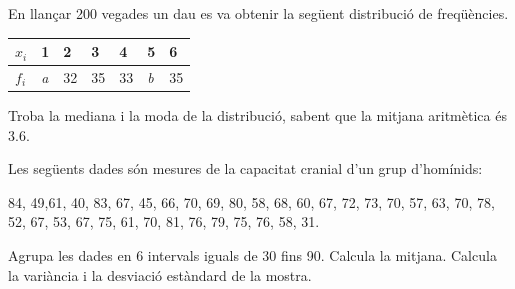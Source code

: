 \begin{activitats}
	\begin{mylist}
		 
\exer  En llançar 200 vegades un dau es va obtenir la següent distribució de freqüències. 
 
\begin{tabular}{|p{0.2in}|p{0.2in}|p{0.2in}|p{0.2in}|p{0.2in}|p{0.2in}|p{0.2in}|} \hline
	
	$x_i$ &  1 & 2 & 3 & 4 & 5  & 6 \\ \hline
    $f_i$ & \textit{a} & 32 & 35  & 33 & \textit{b}  & 35\\ \hline
 
\end{tabular} 

\noindent Troba la mediana i la moda de la distribució, sabent que la mitjana aritmètica és 3.6.


\exer  Les següents dades són mesures de la capacitat cranial d'un grup d'homínids: 

84, 49,61, 40, 83, 67, 45, 66, 70, 69, 80, 58, 68, 60, 67, 72, 73, 70, 57, 63, 70, 78, 52, 67, 53, 67, 75, 61, 70, 81, 76, 79, 75, 76, 58, 31.
\begin{tasks}
\task   Agrupa les dades en 6 intervals iguals de 30 fins 90.
\task  Calcula la mitjana. 
\task  Calcula la variància i la desviació estàndard de la mostra.
\end{tasks}
\answers{ \begin{tabular}{|c|c|}\hline
		\rowcolor{lightgray} $x$ & $y$ \\\hline
		$[30,\;40 )$ & 1\\ \hline 
		$[40,\;50 )$ & 3\\ \hline 
		$[50,\;60 )$ & 5\\ \hline 
		$[60,\;70 )$ & 11\\ \hline 
		$[70,\;80 )$ & 12\\ \hline 
		$[80,\;90 )$ & 4\\ \hline 
	\end{tabular}
	\par
	$N= 36 $; $\sum f\cdot x= 2400 $; $\sum f\cdot x^2= 165300 $
	\par
	$\bar x= 66.67 $;  Var$= 147.22 $; $\sigma= 12.13 $; C.V.= 0.18}


\end{mylist}
\end{activitats}

